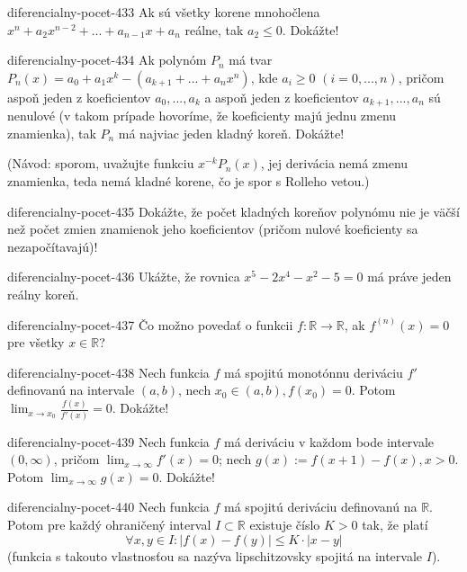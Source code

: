 \begin{defproblem}{diferencialny-pocet-433}
Ak sú všetky korene mnohočlena $x^n+a_2x^{n-2}+...+a_{n-1}x+a_n$ reálne, tak $a_2\leq 0$. Dokážte!
\end{defproblem}

\begin{defproblem}{diferencialny-pocet-434}
Ak polynóm $P_n$ má tvar $P_n(x)=a_0+a_1x^k-(a_{k+1}+...+a_nx^{n})$, kde $a_i \geq 0$ $(i=0,...,n)$, pričom aspoň jeden z koeficientov $a_0,...,a_k$ a aspoň jeden z koeficientov $a_{k+1},...,a_n$ sú nenulové (v takom prípade hovoríme, že koeficienty majú jednu zmenu znamienka), tak $P_n$ má najviac jeden kladný koreň. Dokážte!

(Návod: sporom, uvažujte funkciu $x^{-k}P_n(x)$, jej derivácia nemá zmenu znamienka, teda nemá kladné korene, čo je spor s Rolleho vetou.)
\end{defproblem}

\begin{defproblem}{diferencialny-pocet-435}
Dokážte, že počet kladných koreňov polynómu nie je väčší než počet zmien znamienok jeho koeficientov (pričom nulové koeficienty sa nezapočítavajú)!
\end{defproblem}

\begin{defproblem}{diferencialny-pocet-436}
Ukážte, že rovnica $x^5-2x^4-x^2-5=0$ má práve jeden reálny koreň.
\end{defproblem}

\begin{defproblem}{diferencialny-pocet-437}
Čo možno povedať o funkcii $f:\mathbb{R}\rightarrow\mathbb{R}$, ak $f^{(n)}(x)=0$ pre všetky $x\in\mathbb{R}$?
\end{defproblem}

\begin{defproblem}{diferencialny-pocet-438}
Nech funkcia $f$ má spojitú monotónnu deriváciu $f'$ definovanú na intervale $(a,b)$, nech $x_0\in (a,b),f(x_0)=0$. Potom $\lim_{x\rightarrow x_0}\frac{f(x)}{f'(x)}=0$. Dokážte!
\end{defproblem}

\begin{defproblem}{diferencialny-pocet-439}
Nech funkcia $f$ má deriváciu v každom bode intervale $(0,\infty)$, pričom $\lim_{x\rightarrow \infty}f'(x)=0$; nech $g(x):=f(x+1)-f(x),x>0$. Potom $\lim_{x\rightarrow \infty}g(x)=0$. Dokážte!
\end{defproblem}

\begin{defproblem}{diferencialny-pocet-440}
Nech funkcia $f$ má spojitú deriváciu definovanú na $\mathbb{R}$. Potom pre každý ohraničený interval $I \subset \mathbb{R}$ existuje číslo $K>0$ tak, že platí
$$\forall x,y\in I: |f(x)-f(y)|\leq K\cdot |x-y|$$
(funkcia s takouto vlastnosťou sa nazýva lipschitzovsky spojitá na intervale $I$).
\end{defproblem}

